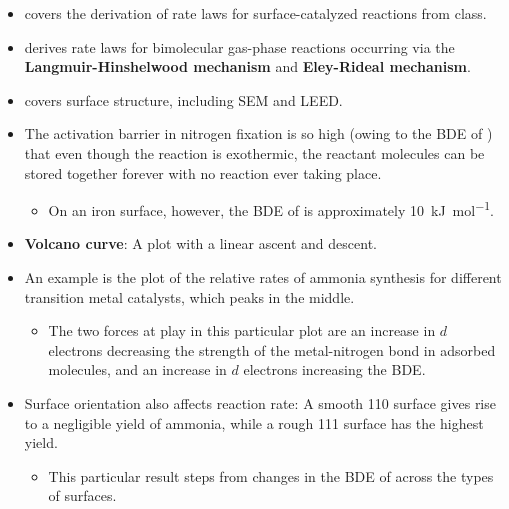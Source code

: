 \documentclass[../notes.tex]{subfiles}
\begin{document}
\begin{itemize}
    \item {}\textcite{bib:McQuarrieSimon} covers the derivation of rate laws for surface-catalyzed reactions from class.
    \item \textcite{bib:McQuarrieSimon} derives rate laws for bimolecular gas-phase reactions occurring via the \textbf{Langmuir-Hinshelwood mechanism} and \textbf{Eley-Rideal mechanism}.
    \item \textcite{bib:McQuarrieSimon} covers surface structure, including SEM and LEED.
    \item The activation barrier in nitrogen fixation is so high (owing to the BDE of ) that even though the reaction is exothermic, the reactant molecules can be stored together forever with no reaction ever taking place.
    \begin{itemize}
        \item On an iron surface, however, the BDE of  is approximately \SI{10}{\kilo\joule\per\mole}.
    \end{itemize}
    \item \textbf{Volcano curve}: A plot with a linear ascent and descent.
    \item An example is the plot of the relative rates of ammonia synthesis for different transition metal catalysts, which peaks in the middle.
    \begin{itemize}
        \item The two forces at play in this particular plot are an increase in $d$ electrons decreasing the strength of the metal-nitrogen bond in adsorbed  molecules, and an increase in $d$ electrons increasing the  BDE.
    \end{itemize}
    \item Surface orientation also affects reaction rate: A smooth 110 surface gives rise to a negligible yield of ammonia, while a rough 111 surface has the highest yield.
    \begin{itemize}
        \item This particular result steps from changes in the BDE of  across the types of surfaces.
    \end{itemize}
\end{itemize}
\end{document}
